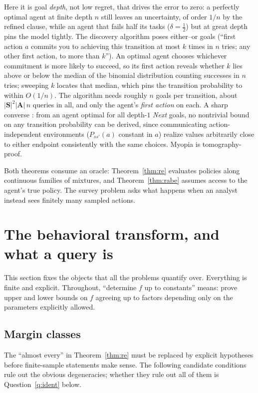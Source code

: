 \documentclass[11pt]{amsart}
\theoremstyle{plain}
\theoremstyle{definition}
\newcommand{\bS}{\mathbf{S}}
\newcommand{\bA}{\mathbf{A}}
\begin{document}
Here it is goal \emph{depth}, not low regret, that drives the error to zero: a perfectly optimal agent at finite depth $n$ still leaves an uncertainty, of order $1/n$ by the refined clause, while an agent that fails half its tasks ($\delta=\tfrac12$) but at great depth pins the model tightly. The discovery algorithm poses either--or goals (``first action $a$ commits you to achieving this transition at most $k$ times in $n$ tries; any other first action, to more than $k$''). An optimal agent chooses whichever commitment is more likely to succeed, so its first action reveals whether $k$ lies above or below the median of the binomial distribution counting successes in $n$ tries; sweeping $k$ locates that median, which pins the transition probability to within $O(1/n)$. The algorithm needs roughly $n$ goals per transition, about $|\bS|^2|\bA|\,n$ queries in all, and only the agent's \emph{first action} on each. A sharp converse \cite[Thm.~2]{richens2025}: from an agent optimal for all depth-$1$ \emph{Next} goals, no nontrivial bound on any transition probability can be derived, since communicating action-independent environments ($P_{ss'}(a)$ constant in $a$) realize values arbitrarily close to either endpoint consistently with the same choices. Myopia is tomography-proof.

Both theorems consume an oracle: Theorem~\ref{thm:re} evaluates policies along continuous families of mixtures, and Theorem~\ref{thm:rabe} assumes access to the agent's true policy. The survey problem asks what happens when an analyst instead sees finitely many sampled actions.

\section{The behavioral transform, and what a query is}\label{sec:setup}

This section fixes the objects that all the problems quantify over. Everything is finite and explicit. Throughout, ``determine $f$ up to constants'' means: prove upper and lower bounds on $f$ agreeing up to factors depending only on the parameters explicitly allowed.

\subsection{Margin classes}

The ``almost every'' in Theorem~\ref{thm:re} must be replaced by explicit hypotheses before finite-sample statements make sense. The following candidate conditions rule out the obvious degeneracies; whether they rule out all of them is Question~\ref{q:ident} below.
\end{document}
